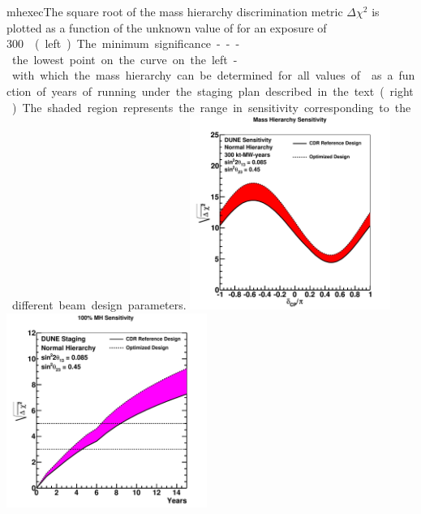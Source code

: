\begin{cdrfigure}{mhexec}{The
    square root of the mass hierarchy discrimination metric $\Delta
    \chi^2$ is plotted as a function of the unknown value of \deltacp
    for an exposure of \SI{300}\ktMWyr{} %
    (left).  The minimum significance
    --- the lowest point on the curve on the left - with which the mass
    hierarchy can be determined for all values of \deltacp as a
    function of years of running under the staging plan described in the text (right).
    The shaded region represents the range in sensitivity corresponding to
    the different beam design parameters.}
\includegraphics[width=0.49\textwidth]{volume-physics/figures/mh_300ktmwyear}
\includegraphics[width=0.49\textwidth]{volume-physics/figures/mh_exp_staging15yr}
\label{fig:mhexec}
\end{cdrfigure}


